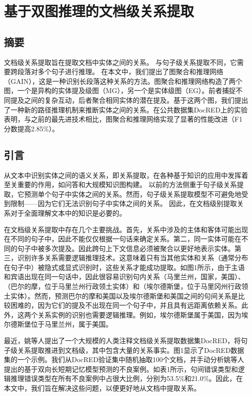 \documentclass[bachelor]{thesis-uestc}
\begin{document}
\thesistranslationchinese
\section{基于双图推理的文档级关系提取}
\subsection{摘要}
文档级关系提取旨在提取文档中实体之间的关系。
与句子级关系提取不同，它需要跨段落对多个句子进行推理。
在本文中，我们提出了图聚合和推理网络（GAIN），这是一种识别长段落这种关系的方法。图聚合和推理网络构造了两个图，一个是异构的实体提及级图（MG），另一个是实体级图（EG）。前者捕捉不同提及之间的复杂互动，后者聚合相同实体的潜在提及。基于这两个图，我们提出了一种新的路径推理机制来推断实体之间的关系。在公共数据集DocRED上的实验表明，与之前的最先进技术相比，图聚合和推理网络实现了显著的性能改进（F1分数提高2.85\%）。\par

\subsection{引言}

从文本中识别实体之间的语义关系，即关系提取，在各种基于知识的应用中发挥着至关重要的作用，如问答和大规模知识图构建。
以前的方法侧重于句子级关系提取，它预测单个句子中实体之间的关系。然而，句子级关系提取模型不可避免地受到限制——因为它们无法识别句子中实体之间的关系。
因此，在文档级别提取关系对于全面理解文本中的知识是必要的。\par

在文档级关系提取中存在几个主要挑战。首先，关系中涉及的主体和客体可能出现在不同的句子中，因此不能仅仅根据一句话来确定关系。第二，同一实体可能在不同的句子中被多次提及。因此跨句上下文信息必须被聚合以更好地表示实体。第三，识别许多关系需要逻辑推理技术。这意味着只有当其他实体和关系（通常分布在句子中）被隐式或显式识别时，这些关系才能成功提取。如图1所示，由于主语和宾语出现在同一句话中，因此很容易识别句内关系（马里兰州，国家，美国）、（巴尔的摩，位于马里兰州行政领土实体）和（埃尔德斯堡，位于马里冈州行政领土实体）。然而，预测巴尔的摩和美国以及埃尔德斯堡和美国之间的句间关系是比较困难的，因为它们的提及不出现在同一个句子中，并且具有远距离依赖关系。此外，这两个关系实例的识别也需要逻辑推理。例如，埃尔德斯堡属于美国，因为埃尔德斯堡位于马里兰州，属于美国。\par

最近，姚等人提出了一个大规模的人类注释文档级关系提取数据集DocRED，将句子级关系提取推进到文档级，其中包含大量的关系事实。图1显示了DocRED数据集的一个示例。我们从DocRED验证集中随机抽取100个文档，并手动分析姚等人提出的基于双向长短期记忆模型预测的不良案例。如表1所示，句间错误类型和逻辑推理错误类型在所有不良案例中占很大比例，分别为53.5\%和21.0\%。因此，在本文中，我们旨在解决这些问题，以便更好地从文档中提取关系。\par
\end{document}
